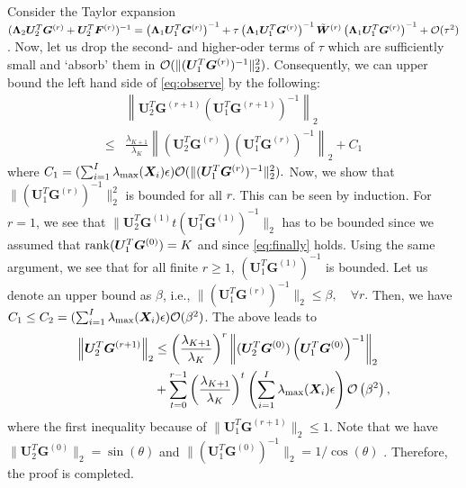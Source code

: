 \documentclass[10pt,journal]{IEEEtran}
\newcommand{\G}{\boldsymbol{G}}
\newcommand{\X}{\boldsymbol{X}}
\newcommand{\U}{\boldsymbol{U}}
\begin{document}
Consider the Taylor expansion $(\bm \Lambda_2 \U_2^T\G^{(r)} + \U_2^T  {\bm F}^{(r)} )^{-1}=  \left(\bm \Lambda_1 \U_1^T\G^{(r)}\right)^{-1} + \tau \left(\bm \Lambda_1 \U_1^T\G^{(r)}\right)^{-1} \tilde{\bm W}^{(r)}\left(\bm \Lambda_1 \U_1^T\G^{(r)}\right)^{-1} + {\cal O}(\tau^2) $.
Now, let us drop the second- and higher-oder terms of $\tau$ which are sufficiently small and `absorb' them in ${\cal O}(\|(\U_1^T\G^{(r)})^{-1}\|_2^2)$. Consequently, we can upper bound the left hand side of \eqref{eq:observe} by the following:
\begin{equation}\label{eq:finally}
\begin{aligned}
&\left\| \U_2^T\G^{(r+1)}\left( \U_1^T\G^{(r+1)} \right)^{-1}  \right\|_2 \\
\leq &\frac{\lambda_{K+1}}{\lambda_K}\left\|( \U_2^T\G^{(r)} )\left( \U_1^T\G^{(r)}\right)^{-1} \right\|_2+C_1
\end{aligned}
\end{equation}
where $C_1= (\sum_{i=1}^I\lambda_{\max}(\X_i)\epsilon) {\cal O}( \|(\U_1^T\G^{(r)})^{-1}\|_2^2).$
Now, we show that $\|(\U_1^T\G^{(r)})^{-1}\|_2^2$ is bounded for all $r$.
This can be seen by induction.
For $r=1$, we see that $\| \U_2^T\G^{(1)}t( \U_1^T\G^{(1)} )^{-1}  \|_2$
has to be bounded since we assumed that ${\rm rank}(\U_1^T\G^{(0)}) = K$ and since
\eqref{eq:finally} holds.
Using the same argument, we see that for all finite $r\geq 1$, $( \U_1^T\G^{(1)} )^{-1}$ is bounded.
Let us denote an upper bound as $\beta$, i.e.,
$\|( \U_1^T\G^{(r)})^{-1}\|_2\leq \beta,\quad \forall r.$
Then, we have $C_1\leq C_2 = (\sum_{i=1}^I\lambda_{\max}(\X_i)\epsilon) {\cal O}(\beta^2)$.
The above leads to
\begin{align*}
\left\| \U_2^T\G^{(r+1)}\right\|_2&\leq \left(\frac{\lambda_{K+1}}{\lambda_K}\right)^r \left\|( \U_2^T\G^{(0)} )\left( \U_1^T\G^{(0)}\right)^{-1} \right\|_2\\
& +\sum_{t=0}^{r-1} \left(\frac{\lambda_{K+1}}{\lambda_K}\right)^t \left(\sum_{i=1}^I\lambda_{\max}(\X_i)\epsilon\right) {\cal O}\left( \beta^2\right),
\end{align*}
where the first inequality because of $\|\U_1^T\G^{(r+1)}\|_2\leq 1$.
Note that we have $\|\U_2^T\G^{(0)} \|_2=\sin(\theta)$ and $\|( \U_1^T\G^{(0)})^{-1}  \|_2= 1/\cos(\theta)$ \cite[Theorem 8.2.2]{GHGolub1996}. Therefore, the proof is completed.








%


\end{document}
